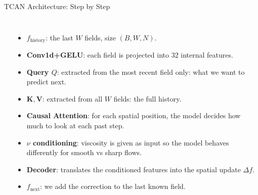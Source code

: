 \begin{frame}{\Large TCAN Architecture: Step by Step}
\begin{columns}[T]
\begin{center}
{%
    }
    \end{center}

    \begin{itemize}
      \item \scriptsize \textbf{$f_{\text{history}}$}: the last $W$ fields, size $(B,W,N)$.
      \item \scriptsize \textbf{Conv1d+GELU}: each field is projected into 32 internal features.
      \item \scriptsize \textbf{Query $Q$}: extracted from the most recent field only: what we want to predict next.
      \item \scriptsize $\mathbf{K},\mathbf{V}$: extracted from all $W$ fields: the full history.
      \item \scriptsize \textbf{Causal Attention}: for each spatial position, the model decides how much to look at each past step.
      \item \scriptsize \textbf{$\nu$ conditioning}: viscosity is given as input so the model behaves differently for smooth vs sharp flows.
      \item \scriptsize \textbf{Decoder}: translates the conditioned features into the spatial update $\Delta f$.
      \item \scriptsize \textbf{$f_{\text{next}}$}: we add the correction to the last known field.
    \end{itemize}
  \end{columns}
\end{frame}

